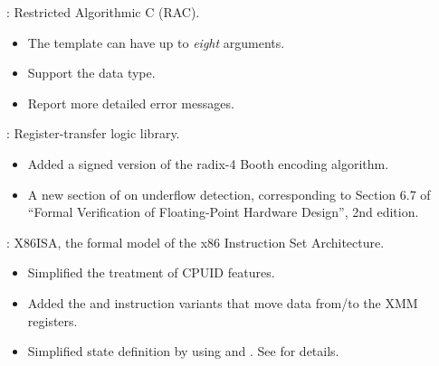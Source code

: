
\begin{frame}

\implibtitle

:
Restricted Algorithmic C (RAC).
\begin{itemize}
\item The  template can have up to {\em eight} arguments.
\item Support the  data type.
\item Report more detailed error messages.
\end{itemize}

\end{frame}


\begin{frame}

\implibtitle

:
Register-transfer logic library.
\begin{itemize}
\item Added a signed version of the radix-4 Booth encoding algorithm.
\item A new section of  on
      underflow detection, corresponding to Section 6.7 of ``Formal
      Verification of Floating-Point Hardware Design'', 2nd edition.
\end{itemize}

\end{frame}


\begin{frame}

\implibtitle

:
X86ISA, the formal model of the x86 Instruction Set Architecture.
\begin{itemize}
\item Simplified the treatment of CPUID features.
\item Added the  and  instruction variants
      that move data from/to the XMM registers.
\item Simplified state definition by using
       and . See
       for details.
\end{itemize}

\end{frame}

